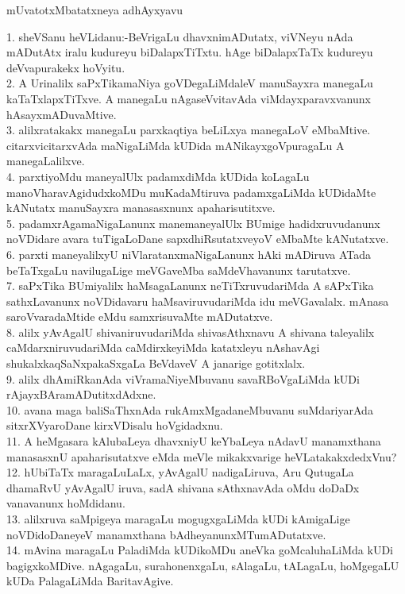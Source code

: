 \documentclass{article}
\begin{document}
\begin{center}
mUvatotxMbatatxneya adhAyxyavu
\end{center}

1. sheVSanu heVLidanu:-BeVrigaLu dhavxnimADutatx, viVNeyu nAda mADutAtx iralu kudureyu biDalapxTiTxtu. hAge biDalapxTaTx kudureyu deVvapurakekx hoVyitu.\\
2. A Urinalilx saPxTikamaNiya goVDegaLiMdaleV manuSayxra manegaLu kaTaTxlapxTiTxve. A manegaLu nAgaseVvitavAda viMdayxparavxvanunx hAsayxmADuvaMtive.\\
3. alilxratakakx manegaLu parxkaqtiya beLiLxya manegaLoV eMbaMtive. citarxvicitarxvAda maNigaLiMda kUDida mANikayxgoVpuragaLu A manegaLalilxve.\\
4. parxtiyoMdu maneyalUlx padamxdiMda kUDida koLagaLu manoVharavAgidudxkoMDu muKadaMtiruva padamxgaLiMda kUDidaMte kANutatx manuSayxra manasasxnunx apaharisutitxve.\\
5. padamxrAgamaNigaLanunx manemaneyalUlx BUmige hadidxruvudanunx noVDidare avara tuTigaLoDane sapxdhiRsutatxveyoV eMbaMte kANutatxve.\\
6. parxti maneyalilxyU niVlaratanxmaNigaLanunx hAki mADiruva ATada beTaTxgaLu navilugaLige meVGaveMba saMdeVhavanunx tarutatxve.\\
7. saPxTika BUmiyalilx haMsagaLanunx neTiTxruvudariMda A sAPxTika sathxLavanunx noVDidavaru haMsaviruvudariMda idu meVGavalalx. mAnasa saroVvaradaMtide eMdu samxrisuvaMte mADutatxve.\\
8. alilx yAvAgalU shivaniruvudariMda shivasAthxnavu A shivana taleyalilx caMdarxniruvudariMda caMdirxkeyiMda katatxleyu nAshavAgi shukalxkaqSaNxpakaSxgaLa BeVdaveV A janarige gotitxlalx.\\
9. alilx dhAmiRkanAda viVramaNiyeMbuvanu savaRBoVgaLiMda kUDi rAjayxBAramADutitxdAdxne.\\
10. avana maga baliSaThxnAda rukAmxMgadaneMbuvanu suMdariyarAda sitxrXVyaroDane kirxVDisalu hoVgidadxnu.\\
11. A heMgasara kAlubaLeya dhavxniyU keYbaLeya nAdavU manamxthana manasasxnU apaharisutatxve eMda meVle mikakxvarige heVLatakakxdedxVnu?\\
12. hUbiTaTx maragaLuLaLx, yAvAgalU nadigaLiruva, Aru QutugaLa dhamaRvU yAvAgalU iruva, sadA shivana sAthxnavAda oMdu doDaDx vanavanunx hoMdidanu.\\
13. alilxruva saMpigeya maragaLu mogugxgaLiMda kUDi kAmigaLige noVDidoDaneyeV manamxthana bAdheyanunxMTumADutatxve.\\
14. mAvina maragaLu PaladiMda kUDikoMDu aneVka goMcaluhaLiMda kUDi bagigxkoMDive. nAgagaLu, surahonenxgaLu, sAlagaLu, tALagaLu, hoMgegaLU kUDa PalagaLiMda BaritavAgive.\\
\end{document}
